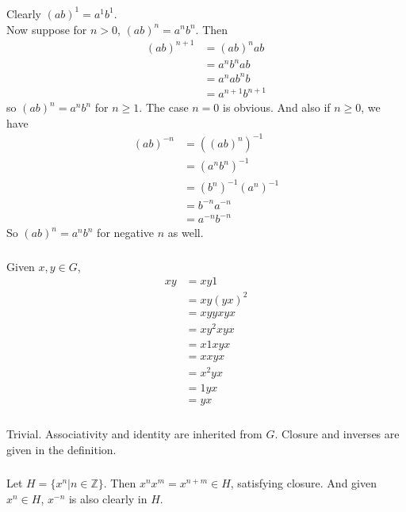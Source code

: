 \documentclass{article}
\newcommand{\ints}{\mathbb{Z}}
\newcommand{\set}[1]{ \{ #1 \} }
\newcommand{\inv}[1]{ {#1}^{-1} }
\begin{document}
\subsubsection{}
Clearly $(ab)^1 = a^1b^1$. 
\\
Now suppose for $n>0$, $(ab)^n = a^nb^n$. Then
\begin{align*}
(ab)^{n+1} &= (ab)^nab\\
&= a^nb^nab\\
&= a^nab^nb\\
&= a^{n+1}b^{n+1}
\end{align*}
so $(ab)^n = a^nb^n$ for $n \geq 1$. The case $n=0$ is obvious. And also if $n \geq 0$, we have
\begin{align*}
(ab)^{-n} &= \inv{((ab)^n)}\\
&= \inv{(a^nb^n)}\\
&= \inv{(b^n)}\inv{(a^n)}\\
&= b^{-n}a^{-n}\\
&= a^{-n}b^{-n}
\end{align*}
So $(ab)^n = a^nb^n$ for negative $n$ as well.
\subsubsection{}
Given $x,y\in G$,
\begin{align*}
xy &= xy1\\
&=xy(yx)^2\\
&=xyyxyx\\
&=xy^2xyx\\
&=x1xyx\\
&=xxyx\\
&=x^2yx\\
&=1yx\\
&=yx
\end{align*}
\subsubsection{}
Trivial. Associativity and identity are inherited from $G$. Closure and inverses are given in the definition.
\subsubsection{}
Let $H = \set{x^n | n \in \ints}$. Then $x^nx^m = x^{n+m} \in H$, satisfying closure. And given $x^n \in H$, $x^{-n}$ is also clearly in $H$.
\end{document}
